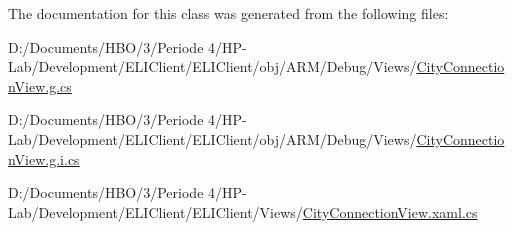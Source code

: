 The documentation for this class was generated from the following files\+:\begin{DoxyCompactItemize}
\item 
D\+:/\+Documents/\+H\+B\+O/3/\+Periode 4/\+H\+P-\/\+Lab/\+Development/\+E\+L\+I\+Client/\+E\+L\+I\+Client/obj/\+A\+R\+M/\+Debug/\+Views/\hyperlink{_a_r_m_2_debug_2_views_2_city_connection_view_8g_8cs}{City\+Connection\+View.\+g.\+cs}\item 
D\+:/\+Documents/\+H\+B\+O/3/\+Periode 4/\+H\+P-\/\+Lab/\+Development/\+E\+L\+I\+Client/\+E\+L\+I\+Client/obj/\+A\+R\+M/\+Debug/\+Views/\hyperlink{_a_r_m_2_debug_2_views_2_city_connection_view_8g_8i_8cs}{City\+Connection\+View.\+g.\+i.\+cs}\item 
D\+:/\+Documents/\+H\+B\+O/3/\+Periode 4/\+H\+P-\/\+Lab/\+Development/\+E\+L\+I\+Client/\+E\+L\+I\+Client/\+Views/\hyperlink{_city_connection_view_8xaml_8cs}{City\+Connection\+View.\+xaml.\+cs}\end{DoxyCompactItemize}
